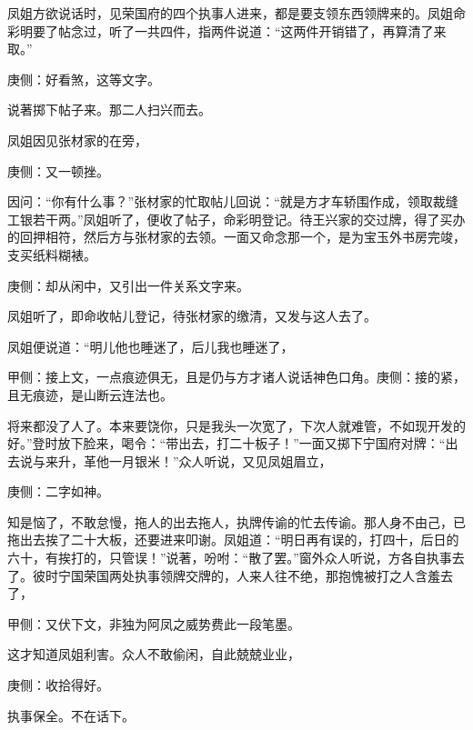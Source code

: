 \begin{parag}
    凤姐方欲说话时，见荣国府的四个执事人进来，都是要支领东西领牌来的。凤姐命彩明要了帖念过，听了一共四件，指两件说道：“这两件开销错了，再算清了来取。”\begin{note}庚侧：好看煞，这等文字。\end{note}说著掷下帖子来。那二人扫兴而去。
\end{parag}


\begin{parag}
    凤姐因见张材家的在旁，\begin{note}庚侧：又一顿挫。\end{note}因问：“你有什么事？”张材家的忙取帖儿回说：“就是方才车轿围作成，领取裁缝工银若干两。”凤姐听了，便收了帖子，命彩明登记。待王兴家的交过牌，得了买办的回押相符，然后方与张材家的去领。一面又命念那一个，是为宝玉外书房完竣，支买纸料糊裱。\begin{note}庚侧：却从闲中，又引出一件关系文字来。\end{note}凤姐听了，即命收帖儿登记，待张材家的缴清，又发与这人去了。
\end{parag}


\begin{parag}
    凤姐便说道：“明儿他也睡迷了，后儿我也睡迷了，\begin{note}甲侧：接上文，一点痕迹俱无，且是仍与方才诸人说话神色口角。庚侧：接的紧，且无痕迹，是山断云连法也。\end{note}将来都没了人了。本来要饶你，只是我头一次宽了，下次人就难管，不如现开发的好。”登时放下脸来，喝令：“带出去，打二十板子！”一面又掷下宁国府对牌：“出去说与来升，革他一月银米！”众人听说，又见凤姐眉立，\begin{note}庚侧：二字如神。\end{note}知是恼了，不敢怠慢，拖人的出去拖人，执牌传谕的忙去传谕。那人身不由己，已拖出去挨了二十大板，还要进来叩谢。凤姐道：“明日再有误的，打四十，后日的六十，有挨打的，只管误！”说著，吩咐：“散了罢。”窗外众人听说，方各自执事去了。彼时宁国荣国两处执事领牌交牌的，人来人往不绝，那抱愧被打之人含羞去了，\begin{note}甲侧：又伏下文，非独为阿凤之威势费此一段笔墨。\end{note}这才知道凤姐利害。众人不敢偷闲，自此兢兢业业，\begin{note}庚侧：收拾得好。\end{note}执事保全。不在话下。
\end{parag}


